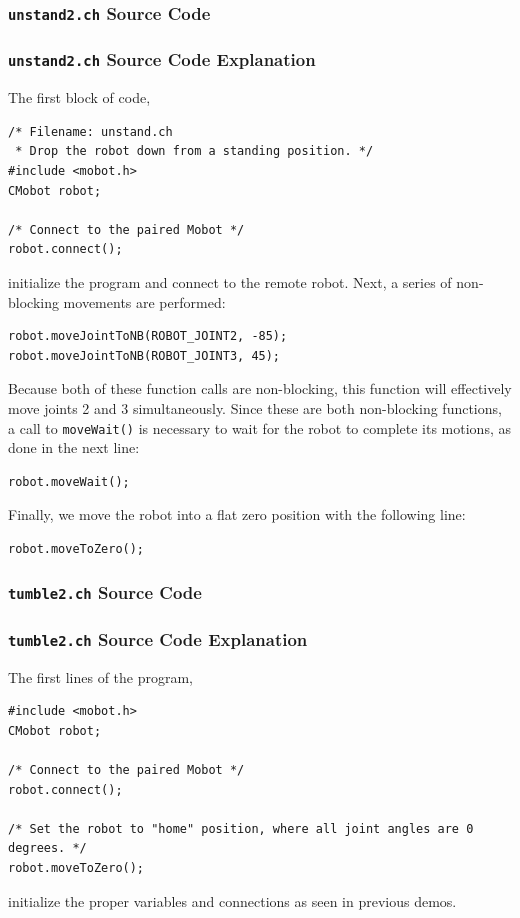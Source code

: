 \documentclass{article}
\begin{document}
\subsubsection{\texttt{unstand2.ch} Source Code}

\subsubsection{\texttt{unstand2.ch} Source Code Explanation}
The first block of code,
\begin{verbatim}
/* Filename: unstand.ch 
 * Drop the robot down from a standing position. */
#include <mobot.h>
CMobot robot;

/* Connect to the paired Mobot */
robot.connect();
\end{verbatim}
initialize the program and connect to the remote robot. Next, a series of
non-blocking movements are performed:
\begin{verbatim}
robot.moveJointToNB(ROBOT_JOINT2, -85);
robot.moveJointToNB(ROBOT_JOINT3, 45);
\end{verbatim}
Because both of these function calls are non-blocking, this function will
effectively move joints 2 and 3 simultaneously. Since these are both
non-blocking functions, a call to \texttt{moveWait()} is necessary to
wait for the robot to complete its motions, as done in the next line:
\begin{verbatim}
robot.moveWait();
\end{verbatim}

Finally, we move the robot into a flat zero position with the following line:
\begin{verbatim}
robot.moveToZero();
\end{verbatim}

\subsubsection{\texttt{tumble2.ch} Source Code}

\subsubsection{\texttt{tumble2.ch} Source Code Explanation}
The first lines of the program,
\begin{verbatim}
#include <mobot.h>
CMobot robot;

/* Connect to the paired Mobot */
robot.connect();

/* Set the robot to "home" position, where all joint angles are 0 degrees. */
robot.moveToZero();
\end{verbatim}
initialize the proper variables and connections as seen in previous demos.
\end{document}
